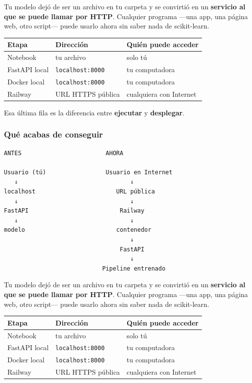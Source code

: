 \documentclass[
]{article}
\newcounter{none} %
\begin{document}
Tu modelo dejó de ser un archivo en tu carpeta y se convirtió en un
\textbf{servicio al que se puede llamar por HTTP}. Cualquier programa
---una app, una página web, otro script--- puede usarlo ahora sin saber
nada de scikit-learn.

{\def\LTcaptype{none} %
\begin{longtable}[]{@{}lll@{}}
\toprule\noalign{}
Etapa & Dirección & Quién puede acceder \\
\midrule\noalign{}
\endhead
\bottomrule\noalign{}
\endlastfoot
Notebook & tu archivo & solo tú \\
FastAPI local & \texttt{localhost:8000} & tu computadora \\
Docker local & \texttt{localhost:8000} & tu computadora \\
Railway & URL HTTPS pública & cualquiera con Internet \\
\end{longtable}
}

Esa última fila es la diferencia entre \textbf{ejecutar} y
\textbf{desplegar}.

\protect{}\label{jJQmjCPvnYyg}
\subsubsection{Qué acabas de
conseguir}\label{quuxe9-acabas-de-conseguir}

\begin{verbatim}
ANTES                        AHORA

Usuario (tú)                 Usuario en Internet
   ↓                                ↓
localhost                       URL pública
   ↓                                ↓
FastAPI                          Railway
   ↓                                ↓
modelo                          contenedor
                                    ↓
                                 FastAPI
                                    ↓
                            Pipeline entrenado
\end{verbatim}

Tu modelo dejó de ser un archivo en tu carpeta y se convirtió en un
\textbf{servicio al que se puede llamar por HTTP}. Cualquier programa
---una app, una página web, otro script--- puede usarlo ahora sin saber
nada de scikit-learn.

{\def\LTcaptype{none} %
\begin{longtable}[]{@{}lll@{}}
\toprule\noalign{}
Etapa & Dirección & Quién puede acceder \\
\midrule\noalign{}
\endhead
\bottomrule\noalign{}
\endlastfoot
Notebook & tu archivo & solo tú \\
FastAPI local & \texttt{localhost:8000} & tu computadora \\
Docker local & \texttt{localhost:8000} & tu computadora \\
Railway & URL HTTPS pública & cualquiera con Internet \\
\end{longtable}
}
\end{document}
